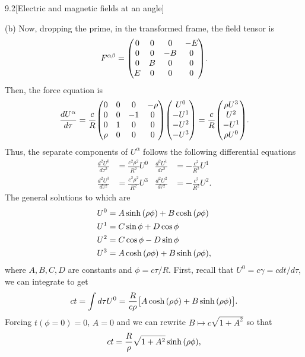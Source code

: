 \documentclass[12pt]{article}
\begin{document}
\begin{problem}{9.2}[Electric and magnetic fields at an angle]
\begin{solution}
(b) Now, dropping the prime, in the transformed frame, the field tensor is
\begin{equation}
    F^{\alpha\beta}=\mqty(0&0&0&-E\\0&0&-B&0\\0&B&0&0\\E&0&0&0). 
\end{equation}
Then, the force equation is
\begin{equation}
    \frac{dU^\alpha}{d\tau}
    =\frac{c}{R}\mqty(0&0&0&-\rho\\0&0&-1&0\\0&1&0&0\\\rho&0&0&0)
    \mqty(U^0\\-U^1\\-U^2\\-U^3)
    =\frac{c}{R}\mqty(\rho U^3\\U^2\\-U^1\\\rho U^0).
\end{equation}
Thus, the separate components of $U^\alpha$ follows the 
following differential equations
\begin{align}
    \frac{d^2U^0}{d\tau^2}&=\frac{c^2\rho^2}{R^2}U^0 &
    \frac{d^2U^1}{d\tau^2}&=-\frac{c^2}{R^2}U^1\\
    \frac{d^2U^3}{d\tau^2}&=\frac{c^2\rho^2}{R^2}U^3 &
    \frac{d^2U^2}{d\tau^2}&=-\frac{c^2}{R^2}U^2.
\end{align}
The general solutions to which are
\begin{subequations}
    \begin{align}
        U^0&=A\sinh\qty(\rho \phi)+B\cosh\qty(\rho\phi)\\
        U^1&=C\sin\phi+D\cos\phi\\
        U^2&=C\cos\phi-D\sin\phi\\
        U^3&=A\cosh\qty(\rho\phi)+B\sinh\qty(\rho\phi),
    \end{align} 
\end{subequations}
where $A,B,C,D$ are constants and $\phi=c\tau/R$. First, recall that
$U^0=c\gamma=cdt/d\tau$, we can integrate to get
\begin{equation}
    ct=\int d\tau U^0
    =\frac{R}{c\rho}\qty[A\cosh\qty(\rho\phi)+B\sinh\qty(\rho\phi)].
\end{equation}
Forcing $t(\phi=0)=0$, $A=0$ and we can rewrite $B\mapsto c\sqrt{1+A^2}$ so that
\begin{equation}
    ct=\frac{R}{\rho}\sqrt{1+A^2}\sinh\qty(\rho\phi), 
\end{equation}

\end{solution}
\end{problem}
\end{document}
